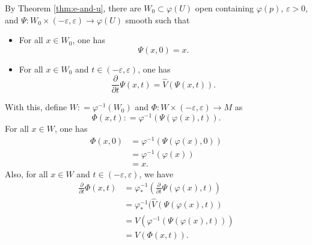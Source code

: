 \documentclass{ximera}
\begin{document}
\begin{theorem}
\begin{solution}
        By Theorem \ref{thm:e-and-u}, there are $ W_0 \subset \varphi (U)$ open  containing $\varphi (p)$, $\varepsilon > 0 $, and $\Psi : W_0 \times (- \varepsilon  , \varepsilon) \to \varphi (U)$ smooth such that 
        \begin{itemize}
            \item For all $x \in W_0$, one has 
            \[   \Psi (x,0) = x .    \]
            \item For all $x \in W_0$ and $t \in (- \varepsilon , \varepsilon )$, one has
            \[    \frac{\partial}{\partial t}  \Psi (x,t) = \hat{V}\left(  \Psi (x,t)    \right) .    \]
        \end{itemize}
        With this, define $W : = \varphi ^{-1} (W_0)$ and $\Phi : W \times (- \varepsilon , \varepsilon ) \to M$ as 
        \[     \Phi (x,t) : = \varphi ^{-1} (  \Psi ( \varphi (x)  , t )    ).     \]
        For all $x \in W$, one has 
        \begin{align*}
            \Phi (x,0 ) & = \varphi ^{-1} (  \Psi ( \varphi (x)  , 0 ) ) \\
            & = \varphi ^{-1} (  \varphi (x)  ) \\
            & = x .
        \end{align*}
        Also, for all $x \in W$ and $t \in (- \varepsilon ,  \varepsilon ) $, we have
        \begin{align*}
            \frac{\partial }{\partial t} \Phi (x,t) & = \varphi ^{-1} _{\ast} (   \frac{\partial }{\partial t} \Psi (  \varphi (x) , t   )   ) \\
            & = \varphi ^{-1} _{\ast} (   \hat{V} ( \Psi   (\varphi (x) , t )  ) \\
            & = V (  \varphi ^{-1}   (   \Psi ( \varphi (x)  , t )  ) ) \\
            & = V ( \Phi (x, t) ) .
        \end{align*}
    \end{solution}
    \end{theorem}
    
\end{document}
